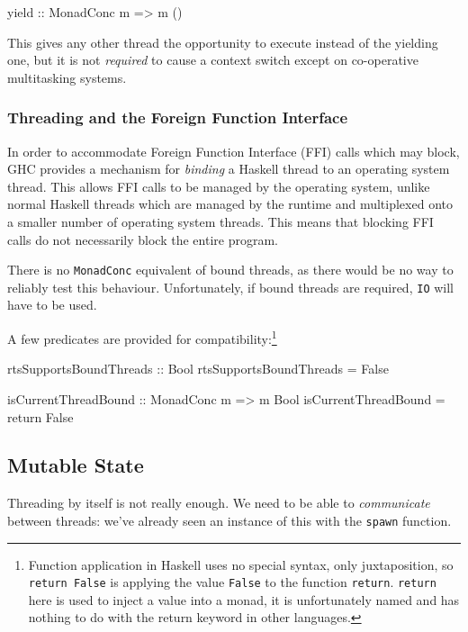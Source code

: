 \begin{haskellcode}
yield :: MonadConc m => m ()
\end{haskellcode}

This gives any other thread the opportunity to execute instead of the
yielding one, but it is not \emph{required} to cause a context switch
except on co-operative multitasking systems.

\subsubsection{Threading and the Foreign Function Interface}
\label{sec:abstraction-typeclass-threads-ffi}

In order to accommodate Foreign Function Interface (FFI) calls which
may block, GHC provides a mechanism for \emph{binding} a Haskell
thread to an operating system thread. This allows FFI calls to be
managed by the operating system, unlike normal Haskell threads which
are managed by the runtime and multiplexed onto a smaller number of
operating system threads. This means that blocking FFI calls do not
necessarily block the entire program.

There is no \verb|MonadConc| equivalent of bound threads, as there
would be no way to reliably test this behaviour. Unfortunately, if
bound threads are required, \verb|IO| will have to be used.

A few predicates are provided for compatibility:\footnote{Function
  application in Haskell uses no special syntax, only juxtaposition,
  so \texttt{return False} is applying the value \texttt{False} to the
  function \texttt{return}. \texttt{return} here is used to inject a
  value into a monad, it is unfortunately named and has nothing to do
  with the return keyword in other languages.}

\begin{haskellcode}
rtsSupportsBoundThreads :: Bool
rtsSupportsBoundThreads = False

isCurrentThreadBound :: MonadConc m => m Bool
isCurrentThreadBound = return False
\end{haskellcode}

\subsection{Mutable State}
\label{sec:abstraction-typeclass-crefs}

Threading by itself is not really enough. We need to be able to
\emph{communicate} between threads: we've already seen an instance
of this with the \verb|spawn| function.

